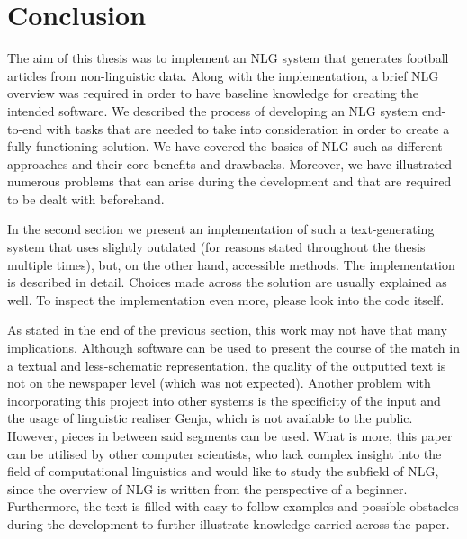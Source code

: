 \chapter*{Conclusion}
The aim of this thesis was to implement an NLG system that generates football articles from non-linguistic data. Along with the implementation, a brief NLG overview was required in order to have baseline knowledge for creating the intended software. We described the process of developing an NLG system end-to-end with tasks that are needed to take into consideration in order to create a fully functioning solution. We have covered the basics of NLG such as different approaches and their core benefits and drawbacks. Moreover, we have illustrated numerous problems that can arise during the development and that are required to be dealt with beforehand.

In the second section we present an implementation of such a text-generating system that uses slightly outdated (for reasons stated throughout the thesis multiple times), but, on the other hand, accessible methods. The implementation is described in detail. Choices made across the solution are usually explained as well. To inspect the implementation even more, please look into the code itself.

As stated in the end of the previous section, this work may not have that many implications. Although software can be used to present the course of the match in a textual and less-schematic representation, the quality of the outputted text is not on the newspaper level (which was not expected). Another problem with incorporating this project into other systems is the specificity of the input and the usage of linguistic realiser Genja, which is not available to the public. However, pieces in between said segments can be used. What is more, this paper can be utilised by other computer scientists, who lack complex insight into the field of computational linguistics and would like to study the subfield of NLG, since the overview of NLG is written from the perspective of a beginner. Furthermore, the text is filled with easy-to-follow examples and possible obstacles during the development to further illustrate knowledge carried across the paper. 
